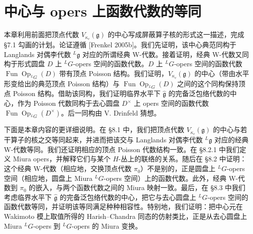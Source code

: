 
\chapter{中心与 opers 上函数代数的等同}

本章利用前面把顶点代数 $V_{\kappa_c}(\mathfrak g)$ 的中心写成屏蔽算子核的形式这一描述，完成 §7.1 勾画的计划。论证遵循 [Frenkel 2005b]。我们先证明，该中心典范同构于 Langlands 对偶李代数 ${}^L\mathfrak g$ 对应的所谓经典 W-代数。接着证明，经典 W-代数又同构于形式圆盘 $D$ 上 ${}^LG$-opers 空间的函数代数。$D$ 上 ${}^LG$-opers 空间的函数代数 $\operatorname{Fun}\operatorname{Op}_{{}^LG}(D)$ 带有顶点 Poisson 结构。我们证明，$V_{\kappa_c}(\mathfrak g)$ 的中心（带由水平形变给出的典范顶点 Poisson 结构）与 $\operatorname{Fun}\operatorname{Op}_{{}^LG}(D)$ 之间的这个同构保持顶点 Poisson 结构。借助该同构，我们证明临界水平下 $\hat{\mathfrak g}$ 的完备泛包络代数的中心，作为 Poisson 代数同构于去心圆盘 $D^\times$ 上 opers 空间的函数代数 $\operatorname{Fun}\operatorname{Op}_{{}^LG}(D^\times)$。后一同构由 V. Drinfeld 猜想。

下面是本章内容的更详细说明。在 §8.1 中，我们把顶点代数 $V_{\kappa_c}(\mathfrak g)$ 的中心与若干算子的核之交等同起来，并进而把该交与 Langlands 对偶李代数 ${}^L\mathfrak g$ 对应的经典 W-代数等同。我们还证明相应的顶点 Poisson 代数结构一致。在 §8.2.1 中我们定义 Miura opers，并解释它们与某个 $H$-丛上的联络的关系。随后在 §8.2 中证明：这个经典 W-代数（相应地，交换顶点代数 $\pi_0$）不是别的，正是圆盘上 ${}^LG$-opers 空间（相应地，圆盘上 Miura ${}^LG$-opers 空间）上的函数代数。此外，经典 W-代数到 $\pi_0$ 的嵌入，与两个函数代数之间的 Miura 映射一致。最后，在 §8.3 中我们考虑临界水平下 $\hat{\mathfrak g}$ 的完备泛包络代数的中心，把它与去心圆盘上 ${}^LG$-opers 空间的函数代数等同，并证明该等同满足种种相容性。特别地，我们证明：把中心元在 Wakimoto 模上取值所得的 Harish--Chandra 同态的仿射类比，正是从去心圆盘上 Miura ${}^LG$-opers 到 ${}^LG$-opers 的 Miura 变换。

